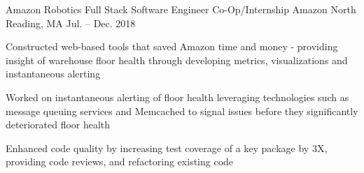 \begin{cventries}
{\begin{cvitems}
       \end{cvitems}
     }
	 \cventry
    {Amazon Robotics Full Stack Software Engineer Co-Op/Internship} %
    {Amazon} %
    {North Reading, MA} %
    {Jul. – Dec. 2018} %
    {
    	\begin{cvitems} %
    		    \item {Constructed web-based tools that saved Amazon time and money - providing insight of warehouse floor health through developing metrics, visualizations and instantaneous alerting}
    			\item {Worked on instantaneous alerting of floor health leveraging technologies such as message queuing services and Memcached to signal issues before they significantly deteriorated floor health}
    			\item {Enhanced code quality by increasing test coverage of a key package by 3X, providing code reviews, and refactoring existing code}
    		 \end{cvitems}
    }



\end{cventries}
